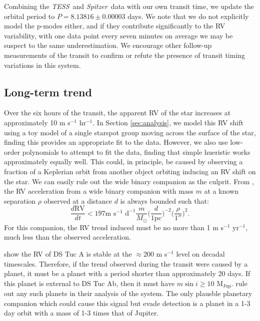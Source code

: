 \documentclass[twocolumn]{aastex62}
\newcommand{\tess}{{\it TESS}}
\newcommand{\spitz}{{\it Spitzer}}
\newcommand{\mjup}{{M$_\textrm{Jup}$}}
\begin{document}
Combining the \tess\ and \spitz\ data with our own transit time, we update the orbital period to $P= 8.13816 \pm 0.00003$ days. 
We note that we do not explicitly model the p-modes either, and if they contribute significantly to the RV variability, with one data point every seven minutes on average we may be suspect to the same underestimation.
We encourage other follow-up measurements of the transit to confirm or refute the presence of transit timing variations in this system.


\subsection{Long-term trend}

Over the six hours of the transit, the apparent RV of the star increases at approximately 10 m s$^{-1}$ hr$^{-1}$. 
In Section \ref{sec:analysis}, we model this RV shift using a toy model of a single 
starspot group moving across the surface of the star, finding this provides an appropriate fit to the data. 
However, we also use low-order polynomials to attempt to fit the data, finding that simple hueristic works approximately equally well.
This could, in principle, be caused by observing a fraction of a Keplerian orbit from another object orbiting inducing an RV shift on the star. 
We can easily rule out the wide binary companion as the culprit.
From \citet{Liu02}, the RV acceleration from a wide binary companion with mass $m$ at a known separation $\rho$ observed at a distance $d$ is always bounded such that:
\begin{equation}
    \frac{d\textrm{RV}}{dt} < 197 \textrm{m } \textrm{s}^{-1} \textrm{ d}^{-1}
    \frac{m}{M_\odot} \bigg(\frac{d}{1\textrm{pc}}\bigg)^{-2} \bigg(\frac{\rho}{1''}\bigg)^{2}.
\end{equation}
For this companion, the RV trend induced must be no more than 1 m s$^{-1}$ yr$^{-1}$, much less than the observed acceleration.

\citet{Benatti19} show the RV of DS Tuc A is stable at the $\approx 200$ m s$^{-1}$ level on decadal timescales. 
Therefore, if the trend observed during the transit were caused by a planet, it must be a planet with a period shorter than approximately 20 days. 
If this planet is external to DS Tuc Ab, then it must have $m \sin i \geq 10$ \mjup. 
\citet{Benatti19} rule out any such planets in their analysis of the system.
The only plausble planetary companion which could cause this signal but evade detection is a planet in a 1-3 day orbit with a mass of 1-3 times that of Jupiter. 
\end{document}
